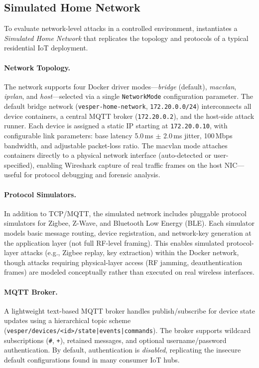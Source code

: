 \subsection{Simulated Home Network}\label{sec:home-network}

To evaluate network-level attacks in a controlled environment,
\sys{} instantiates a \emph{Simulated Home Network} that replicates
the topology and protocols of a typical residential IoT deployment.

\paragraph{Network Topology.}
The network supports four Docker driver modes---\emph{bridge}
(default), \emph{macvlan}, \emph{ipvlan}, and \emph{host}---selected
via a single \texttt{NetworkMode} configuration parameter.
The default bridge network (\texttt{vesper-home-network},
\texttt{172.20.0.0/24}) interconnects all device containers, a
central MQTT broker (\texttt{172.20.0.2}), and the host-side
attack runner.  Each device is assigned a static IP starting at
\texttt{172.20.0.10}, with configurable link parameters: base
latency 5.0\,ms $\pm$ 2.0\,ms jitter, 100\,Mbps bandwidth, and
adjustable packet-loss ratio.  The macvlan mode attaches containers
directly to a physical network interface (auto-detected or
user-specified), enabling Wireshark capture of real traffic frames
on the host NIC---useful for protocol debugging and forensic analysis.

\paragraph{Protocol Simulators.}
In addition to TCP/MQTT, the simulated network includes pluggable
protocol simulators for Zigbee, Z-Wave, and Bluetooth Low Energy
(BLE).  Each simulator models basic message routing, device
registration, and network-key generation at the application layer
(not full RF-level framing).  This enables simulated protocol-layer
attacks (e.g., Zigbee replay, key extraction) within the Docker
network, though attacks requiring physical-layer access (RF
jamming, deauthentication frames) are modeled conceptually
rather than executed on real wireless interfaces.

\paragraph{MQTT Broker.}
A lightweight text-based MQTT broker handles publish/subscribe for
device state updates using a hierarchical topic scheme
(\texttt{vesper/devices/<id>/state|events|commands}).
The broker supports wildcard subscriptions (\texttt{\#}, \texttt{+}),
retained messages, and optional username/password authentication.
By default, authentication is \emph{disabled}, replicating the
insecure default configurations found in many consumer IoT hubs.

